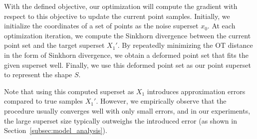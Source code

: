With the defined objective, our optimization will compute the gradient with respect to this objective to update the current point samples.
%
Initially, we initialize the coordinates of a set of points as the noise superset $x_0$.
%
At each optimization iteration, we compute the Sinkhorn divergence between the current point set and the target superset $X_1'$.
%
By repeatedly minimizing the OT distance in the form of Sinkhorn divergence, we obtain a deformed point set that fits the given superset well.
%
Finally, we use this deformed point set as our point superset to represent the shape $S$.


Note that using this computed superset as $X_1$ introduces approximation errors compared to true samples $X_1'$.
%
However, we empirically observe that the procedure usually converges well with only small errors, and in our experiments, the large superset size typically outweighs the introduced error (as shown in Section~\ref{subsec:model_analysis}).



